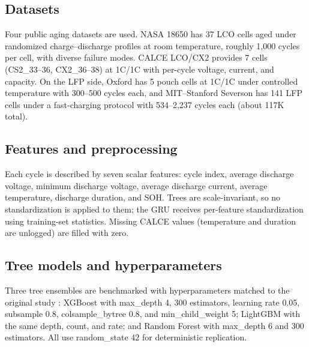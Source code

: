 \documentclass[journal]{IEEEtran}
\begin{document}
\subsection{Datasets}
Four public aging datasets are used. NASA 18650 \cite{saha2007battery} has 37 LCO cells aged under randomized charge--discharge profiles at room temperature, roughly 1,000 cycles per cell, with diverse failure modes. CALCE LCO/CX2 \cite{calce2023battery} provides 7 cells (CS2\_33--36, CX2\_36--38) at 1C/1C with per-cycle voltage, current, and capacity. On the LFP side, Oxford \cite{birkl2017oxford} has 5 pouch cells at 1C/1C under controlled temperature with 300--500 cycles each, and MIT--Stanford Severson \cite{severson2019data} has 141 LFP cells under a fast-charging protocol with 534--2,237 cycles each (about 117K total).

\subsection{Features and preprocessing}
Each cycle is described by seven scalar features: cycle index, average discharge voltage, minimum discharge voltage, average discharge current, average temperature, discharge duration, and SOH. Trees are scale-invariant, so no standardization is applied to them; the GRU receives per-feature standardization using training-set statistics. Missing CALCE values (temperature and duration are unlogged) are filled with zero.

\subsection{Tree models and hyperparameters}
Three tree ensembles are benchmarked with hyperparameters matched to the original study \cite{shikdar2026learning}: XGBoost \cite{chen2016xgboost} with max\_depth 4, 300 estimators, learning rate 0.05, subsample 0.8, colsample\_bytree 0.8, and min\_child\_weight 5; LightGBM \cite{ke2017lightgbm} with the same depth, count, and rate; and Random Forest \cite{breiman2001random} with max\_depth 6 and 300 estimators. All use random\_state 42 for deterministic replication.
\end{document}
